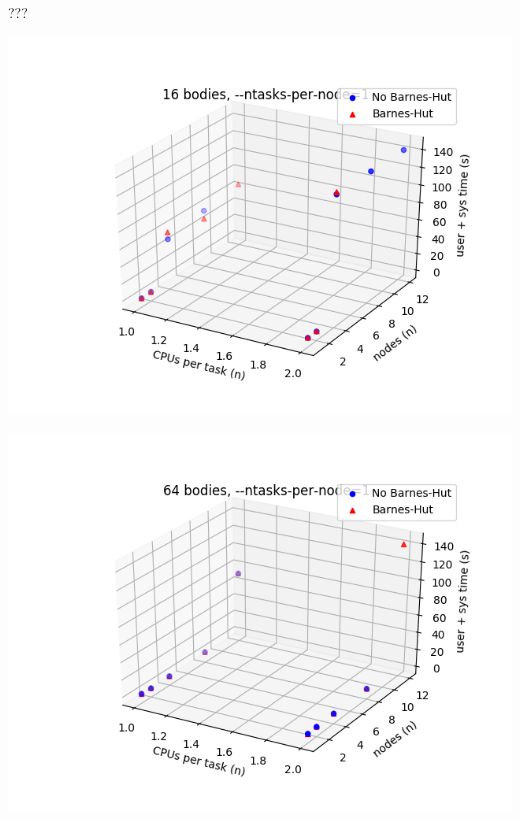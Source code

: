\documentclass{beamer}
\begin{document}
\begin{frame}[allowframebreaks]{???}
\framebreak

\includegraphics[width=\linewidth]{16-cpusPerTask-nodes-just_1_tpn}

\framebreak

\includegraphics[width=\linewidth]{64-cpusPerTask-nodes-just_1_tpn}

\framebreak


\end{frame}
\end{document}
